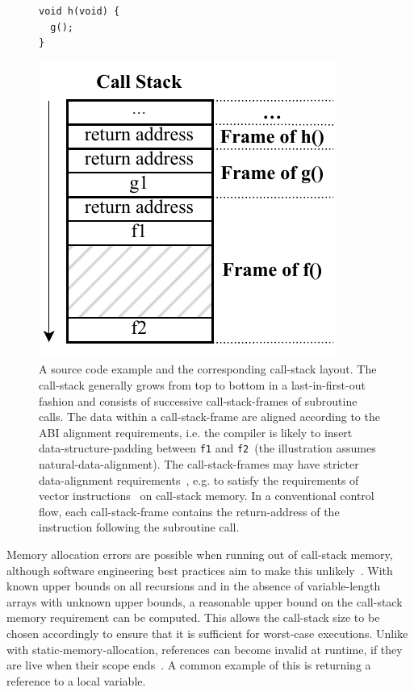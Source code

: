 \begin{figure}[htb]
\begin{minipage}{0.35\textwidth}
\begin{lstlisting}[style=C]
void h(void) {
  g();
}
    \end{lstlisting}
  \end{minipage}
  \begin{minipage}{0.5\textwidth}
    \includegraphics{Figures/CallStack.pdf}
  \end{minipage}
  \caption{Call Stack and Call Stack Frames.}
  \label{fig:stack}
  \caption*{A source code example and the corresponding \gls{call-stack} layout. The \gls{call-stack} generally grows from top to bottom in a last-in-first-out fashion and consists of successive \glspl{call-stack-frame} of subroutine calls. The data within a \gls{call-stack-frame} are aligned according to the \gls{ABI} alignment requirements, i.e. the compiler is likely to insert \gls{data-structure-padding} between \lstinline|f1| and \lstinline|f2|~(the illustration assumes \gls{natural-data-alignment}). The \glspl{call-stack-frame} may have stricter \gls{data-alignment} requirements~\cite{sysVAMD64}, e.g. to satisfy the requirements of vector instructions~\cite{ia32} on \gls{call-stack} memory. In a conventional control flow, each \gls{call-stack-frame} contains the \gls{return-address} of the instruction following the subroutine call.}
\end{figure}

Memory allocation errors are possible when running out of \gls{call-stack} memory, although software engineering best practices aim to make this unlikely~\cite{misra-2012}. With known upper bounds on all recursions and in the absence of variable-length arrays with unknown upper bounds, a reasonable upper bound on the \gls{call-stack} memory requirement can be computed. This allows the \gls{call-stack} size to be chosen accordingly to ensure that it is sufficient for worst-case executions. Unlike with \gls{static-memory-allocation}, references can become invalid at runtime, if they are live when their scope ends~\cite{ISO:2018:III}. A common example of this is returning a reference to a local variable.

